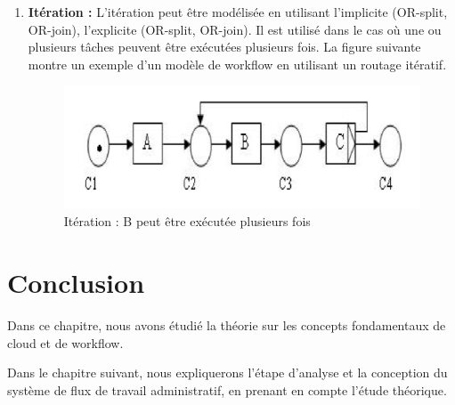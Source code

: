\begin{enumerate}
	\item \textbf{Itération :} L’itération peut être modélisée en utilisant l’implicite (OR-split, OR-join), l’explicite (OR-split, OR-join). Il est utilisé dans le cas où une ou plusieurs tâches peuvent être exécutées plusieurs fois. La figure suivante montre un exemple d’un modèle de workflow en utilisant un routage itératif.
	
	
	\begin{figure}[H]
		\centering
		\includegraphics[width=0.7\linewidth]{images/wf008}
		\caption{Itération : B peut être exécutée plusieurs fois}
		\label{fig:wf008}
	\end{figure}
\end{enumerate}





\section{Conclusion}
Dans ce chapitre, nous avons étudié la théorie sur les concepts fondamentaux de cloud et de workflow. 

Dans le chapitre suivant, nous expliquerons l'étape d'analyse et la conception du système de flux de travail administratif, en prenant en compte l'étude théorique.